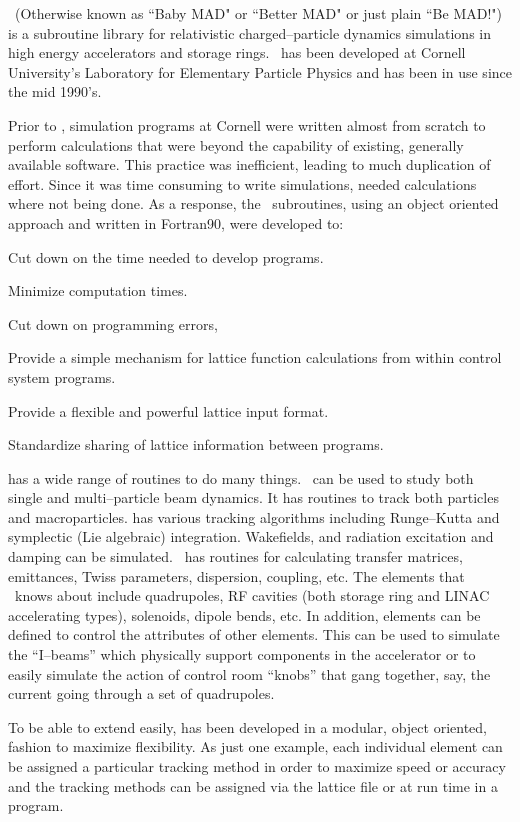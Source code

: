 
\bmad\ (Otherwise known as ``Baby MAD" or ``Better MAD" or just plain
``Be MAD!")  is a subroutine library for relativistic
charged--particle dynamics simulations in high energy accelerators and
storage rings. \bmad\ has been developed at Cornell University's
Laboratory for Elementary Particle Physics and has been in use since
the mid 1990's. 

Prior to \bmad, simulation programs at Cornell were written almost from 
scratch to perform
calculations that were beyond the capability of existing, generally
available software. This practice was inefficient, leading to much
duplication of effort.  Since it was time consuming to write
simulations, needed calculations where not being done.  As a response,
the \bmad\ subroutines, using an object oriented approach and written
in Fortran90, were developed to:
\begin{Itemize}
\item Cut down on the time needed to develop programs.
\item Minimize computation times.
\item Cut down on programming errors, 
\item Provide a simple mechanism for lattice function calculations
from within control system programs.
\item Provide a flexible and powerful lattice input format.
\item Standardize sharing of lattice information between 
programs.
\end{Itemize}

\bmad has a wide range of routines to do many things.  \bmad\ can be
used to study both single and multi--particle beam dynamics.  It has
routines to track both particles and macroparticles. \bmad has various
tracking algorithms including Runge--Kutta and symplectic (Lie
algebraic) integration.  Wakefields, and radiation excitation and
damping can be simulated. \bmad\ has routines for calculating transfer
matrices, emittances, Twiss parameters, dispersion, coupling, etc. The
elements that \bmad\ knows about include quadrupoles, RF cavities
(both storage ring and LINAC accelerating types), solenoids, dipole
bends, etc. In addition, elements can be defined to control the
attributes of other elements. This can be used to simulate the
``I--beams'' which physically support components in the accelerator
 or to easily simulate the action of control room ``knobs''
that gang together, say, the current going through a set of quadrupoles.

To be able to extend \bmad easily, \bmad has been developed
in a modular, object oriented, fashion to maximize flexibility. As just one 
example, each individual element can be assigned a particular tracking method
in order to maximize speed or accuracy and the tracking methods can be assigned
via the lattice file or at run time in a program.


\vfill
\break
